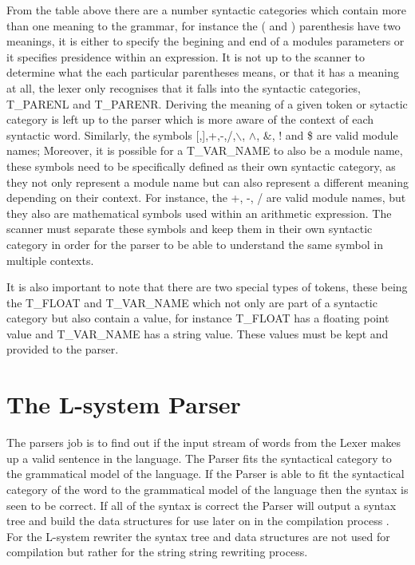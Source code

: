\begin{flushleft}
From the table above there are a number syntactic categories which contain more than one meaning to the grammar, for instance the ( and ) parenthesis have two meanings, it is either to specify the begining and end of a modules parameters or it specifies presidence within an expression.  It is not up to the scanner to determine what the each particular parentheses means, or that it has a meaning at all, the lexer only recognises that it falls into the syntactic categories, T\_PARENL and T\_PARENR. Deriving the meaning of a given token or sytactic category is left up to the parser which is more aware of the context of each syntactic word. Similarly, the symbols [,],+,-,/,$\backslash$, $\land$, $\&$, ! and \$ are valid module names; Moreover, it is possible for a T\_VAR\_NAME to also be a module name, these symbols need to be specifically defined as their own syntactic category, as they not only represent a module name but can also represent a different meaning depending on their context. For instance, the +, -, / are valid module names, but they also are mathematical symbols used within an arithmetic expression. The scanner must separate these symbols and keep them in their own syntactic category in order for the parser to be able to understand the same symbol in multiple contexts. \\

\vspace{5mm}


It is also important to note that there are two special types of tokens, these being the T\_FLOAT and T\_VAR\_NAME which not only are part of a syntactic category but also contain a value, for instance T\_FLOAT has a floating point value and T\_VAR\_NAME has a string value. These values must be kept and provided to the parser.\\

\end{flushleft}

\section{The L-system Parser} \label{parser}

The parsers job is to find out if the input stream of words from the \gls{Lexer} makes up a valid sentence in the language. The \gls{Parser} fits the syntactical category to the grammatical model of the language. If the \gls{Parser} is able to fit the syntactical category of the word to the grammatical model of the language then the syntax is seen to be correct. If all of the syntax is correct the \gls{Parser} will output a syntax tree and build the data structures for use later on in the compilation process \cite{cooper2011engineering}. For the L-system rewriter the syntax tree and data structures are not used for compilation but rather for the string string rewriting process.

